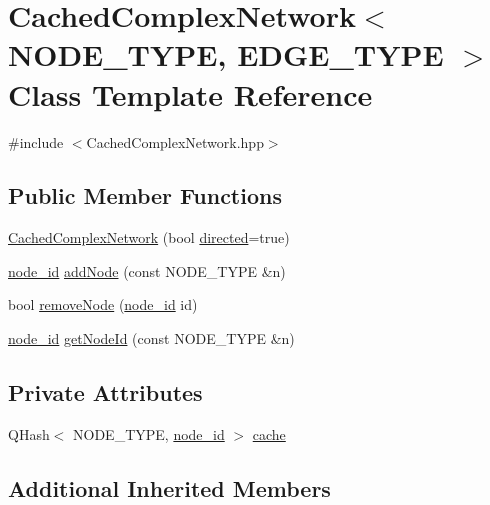 \hypertarget{class_cached_complex_network}{\section{Cached\+Complex\+Network$<$ N\+O\+D\+E\+\_\+\+T\+Y\+P\+E, E\+D\+G\+E\+\_\+\+T\+Y\+P\+E $>$ Class Template Reference}
\label{class_cached_complex_network}
}


{\ttfamily \#include $<$Cached\+Complex\+Network.\+hpp$>$}

\subsection*{Public Member Functions}
\begin{DoxyCompactItemize}
\item 
\hyperlink{class_cached_complex_network_a47272a6c81ef87c488a7b3469af6a646}{Cached\+Complex\+Network} (bool \hyperlink{class_complex_network_ae1f8a32f89d84aab42475d8fe46dfa09}{directed}=true)
\item 
\hyperlink{_complex_network_8hpp_a8323334ca788fde39682469321590d52}{node\+\_\+id} \hyperlink{class_cached_complex_network_ad6e24699a050f5f2d7f908aba40b931c}{add\+Node} (const N\+O\+D\+E\+\_\+\+T\+Y\+P\+E \&n)
\item 
bool \hyperlink{class_cached_complex_network_a800aa02b94aa4bb73227e139cb246ddf}{remove\+Node} (\hyperlink{_complex_network_8hpp_a8323334ca788fde39682469321590d52}{node\+\_\+id} id)
\item 
\hyperlink{_complex_network_8hpp_a8323334ca788fde39682469321590d52}{node\+\_\+id} \hyperlink{class_cached_complex_network_ab3e77a01c6e77cc9983494174734f716}{get\+Node\+Id} (const N\+O\+D\+E\+\_\+\+T\+Y\+P\+E \&n)
\end{DoxyCompactItemize}
\subsection*{Private Attributes}
\begin{DoxyCompactItemize}
\item 
Q\+Hash$<$ N\+O\+D\+E\+\_\+\+T\+Y\+P\+E, \hyperlink{_complex_network_8hpp_a8323334ca788fde39682469321590d52}{node\+\_\+id} $>$ \hyperlink{class_cached_complex_network_ad0ac80eabd1a95fec5134a3fcbbe2f50}{cache}
\end{DoxyCompactItemize}
\subsection*{Additional Inherited Members}


